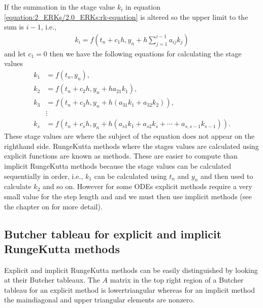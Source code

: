 \documentclass[letterpaper,10pt,english]{jupyterBook}
\begin{document}
\sphinxAtStartPar
If the summation in the stage value \(k_i\) in equation \eqref{equation:2_ERKs/2.0_ERKs:rk-equation} is altered so the upper limit to the sum is \(i-1\), i.e.,
\begin{align*}
    k_i = f(t_n + c_1 h,y_n + h\sum_{j=1}^{i-1} a_{ij} k_j)
\end{align*}
\sphinxAtStartPar
and let \(c_1 = 0\) then we have the following equations for calculating the stage values
\begin{align*}
    k_1 &=f(t_n ,y_n),\\
    k_2 &=f(t_n +c_2 h,y_n +ha_{21} k_1 ),\\
    k_3 &=f(t_n +c_3 h,y_n +h(a_{31} k_1 +a_{32} k_2 )),\\
    &\vdots \\
    k_s &=f(t_n +c_s h,y_n +h(a_{s1} k_1 +a_{s2} k_s +\cdots +a_{s,s-1} k_{s-1} )).
\end{align*}
\sphinxAtStartPar
These stage values are  where the subject of the equation does not appear on the right\sphinxhyphen{}hand side. Runge\sphinxhyphen{}Kutta methods where the stages values are calculated using explicit functions are known as  methods. These are easier to compute than implicit Runge\sphinxhyphen{}Kutta methods because the stage values can be calculated sequentially in order, i.e., \(k_1\) can be calculated using \(t_n\) and \(y_n\) and then used to calculate \(k_2\) and so on. However for some ODEs explicit methods require a very small value for the step length and and we must then use implicit methods (see the chapter on {\hyperref[\detokenize{4_Stability/4.0_Stability:stability-chapter}]{}} for more detail).


\subsection{Butcher tableau for explicit and implicit Runge\sphinxhyphen{}Kutta methods}
\label{\detokenize{2_ERKs/2.0_ERKs:butcher-tableau-for-explicit-and-implicit-runge-kutta-methods}}
\sphinxAtStartPar
Explicit and implicit Runge\sphinxhyphen{}Kutta methods can be easily distinguished by looking at their Butcher tableaux. The \(A\) matrix in the top right region of a Butcher tableau for an explicit method is lower\sphinxhyphen{}triangular whereas for an implicit method the main\sphinxhyphen{}diagonal and upper triangular elements are non\sphinxhyphen{}zero.
\end{document}
